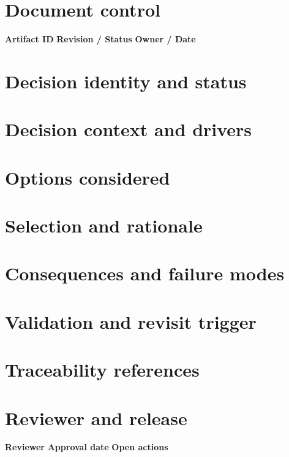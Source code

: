 \documentclass[10pt,letterpaper]{article}
\begin{document}
\DocProvenance
\section{Document control}
\textbf{Artifact ID}
\textbf{Revision / Status}
\textbf{Owner / Date}
\section{Decision identity and status}
\section{Decision context and drivers}
\section{Options considered}
\section{Selection and rationale}
\section{Consequences and failure modes}
\section{Validation and revisit trigger}
\section{Traceability references}
\section{Reviewer and release}
\textbf{Reviewer}
\textbf{Approval date}
\textbf{Open actions}
\end{document}
